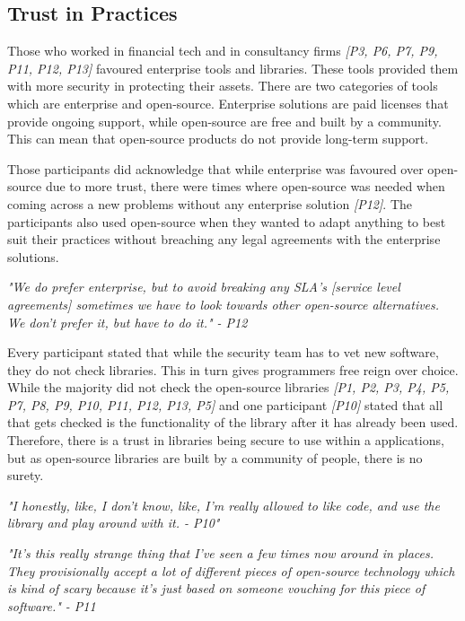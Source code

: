 \subsection{Trust in Practices}

\par Those who worked in financial tech and in consultancy firms \textit{[P3, P6, P7, P9, P11, P12, P13]} favoured enterprise tools and libraries. These tools provided them with more security in protecting their assets. There are two categories of tools which are enterprise and open-source. Enterprise solutions are paid licenses that provide ongoing support, while open-source are free and built by a community. This can mean that open-source products do not provide long-term support. 
\newline
\par
Those participants did acknowledge that while enterprise was favoured over open-source due to more trust, there were times where open-source was needed when coming across a new problems without any enterprise solution \textit{[P12]}. The participants also used open-source when they wanted to adapt anything to best suit their practices without breaching any legal agreements with the enterprise solutions. 
\newline
\par
\textit{"We do prefer enterprise, but to avoid breaking any SLA's [service level agreements] sometimes we have to look towards other open-source alternatives. We don't prefer it, but have to do it." - P12}
\newline
\par
Every participant stated that while the security team has to vet new software, they do not check libraries. This in turn gives programmers free reign over choice. While the majority did not check the open-source libraries  \textit{[P1, P2, P3, P4, P5, P7, P8, P9, P10, P11, P12, P13, P5]} and one participant \textit{[P10]} stated that all that gets checked is the functionality of the library after it has already been used. Therefore, there is a trust in libraries being secure to use within a applications, but as open-source libraries are built by a community of people, there is no surety. 
\newline
\par
\textit{"I honestly, like, I don't know, like, I'm really allowed to like code, and use the library and play around with it. - P10"}
\newline
\par
\textit{"It's this really strange thing that I've seen a few times now around in places. They provisionally accept a lot of different pieces of open-source technology which is kind of scary because it's just based on someone vouching for this piece of software." - P11}
